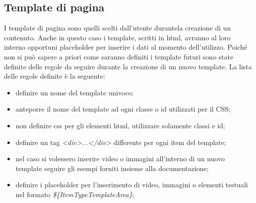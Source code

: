 \subsection{Template di pagina}
I template di pagina sono quelli scelti dall'utente durantela creazione di un contenuto.
Anche in questo caso i template, scritti in html, avranno al loro interno opportuni placeholder per inserire i dati al momento dell'utilizzo. Poiché non si può sapere a priori come saranno definiti i template futuri sono state definite delle regole da seguire durante la creazione di un nuovo template. La lista delle regole definite è la seguente:
\begin{itemize}
    \item definire un nome del template univoco;
    \item anteporre il nome del template ad ogni classe o id utilizzati per il CSS;
    \item non definire css per gli elementi html, utilizzare solamente classi e id;
    \item definire un tag \textit{<div>...</div>} differente per ogni item del template;
    \item nel caso si volessero inserire video o immagini all'interno di un nuovo template seguire gli esempi forniti insieme alla documentazione;
    \item definire i placeholder per l'inserimento di video, immagini o elementi testuali nel formato \textit{\$\{ItemTypeTemplateArea\}};
\end{itemize}

